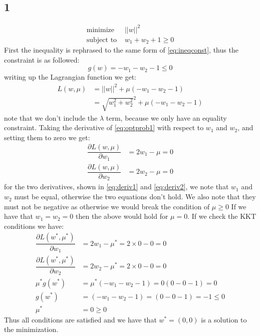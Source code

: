 \documentclass{article}
\begin{document}
\subsection{1}
\begin{align}
\text{minimize } &||w||^2 \\
\text{subject to } &w_1 + w_2 + 1 \geq 0
\end{align}
First the inequality is rephrased to the same form of \eqref{eq:ineqconst}, thus the constraint is as followed:
\begin{equation}
g(w) = -w_1 - w_2 -1 \leq 0
\end{equation}
writing up the Lagrangian function we get:
\begin{align}
L(w,\mu) &= ||w||^2 + \mu(-w_1 - w_2 - 1) \\
\label{eq:optprob1}
&= \sqrt{w_1^2 + w_2^2}^2 + \mu(-w_1 - w_2 - 1)
\end{align}
note that we don't include the $\lambda$ term, because we only have an equality constraint. Taking the derivative of \eqref{eq:optprob1} with respect to $w_1$ and $w_2$, and setting them to zero we get:
\begin{align}
\label{eq:deriv1}
\dfrac{\partial L (w, \mu)}{\partial w_1} &= 2 w_1 - \mu = 0 \\
\label{eq:deriv2}
\dfrac{\partial L (w, \mu)}{\partial w_2} &= 2 w_2 - \mu = 0
\end{align}
for the two derivatives, shown in \eqref{eq:deriv1} and \eqref{eq:deriv2}, we note that $w_1$ and $w_2$ must be equal, otherwise the two equations don't hold. We also note that they must not be negative as otherwise we would break the condition of $\mu \geq 0$ If we have that $w_1=w_2=0$ then the above would hold for $\mu = 0$. If we check the KKT conditions we have:
\begin{align}
\dfrac{\partial L (w^*, \mu^*)}{\partial w_1} &= 2 w_1 - \mu^*
 = 2 \times 0 - 0 = 0 \\
\dfrac{\partial L (w^*, \mu^*)}{\partial w_2} &= 
2 w_2 - \mu^* = 2 \times 0 - 0 = 0 \\
\mu^* g(w^*) &= \mu^* (-w_1 - w_2 -1) = 0 (0 - 0 - 1) = 0 \\
g(w^*) &= (-w_1 - w_2 - 1) = (0 - 0 - 1) = -1 \leq 0 \\
\mu^* &= 0 \geq 0
\end{align}
Thus all conditions are satisfied and we have that $w^* = (0,0)$ is a solution to the minimization.
\end{document}
